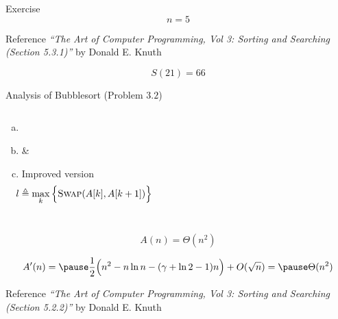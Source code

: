 \begin{frame}{}
  \begin{exampleblock}{Exercise}
    \[
      n = 5
    \]
  \end{exampleblock}

  \pause
  \vspace{0.80cm}
  \begin{alertblock}{Reference}
    {\it ``The Art of Computer Programming, Vol 3: Sorting and Searching (Section 5.3.1)''} by Donald E. Knuth
  \end{alertblock}

  \[
    S(21) = 66
  \]
\end{frame}

\begin{frame}{}
  \begin{exampleblock}{Analysis of Bubblesort (Problem $3.2$)}
    \begin{columns}
	\begin{enumerate}[(a)]
	  \item {}
	  \item {} \& 
	  \item Improved version 
	    \[
	      \!\!\!\! l \triangleq \max_{k} \Big\{\textsc{Swap}(A[k], A[k+1])\Big\}
	    \]
	\end{enumerate}
	
    \end{columns}
  \end{exampleblock}

  \pause
  \[
    A(n) = \Theta(n^2)
  \]

  \pause
  \vspace{-0.30cm}
  \[
    A'(n) = \pause \frac{1}{2} \Big(n^2 - n \ln n - (\gamma + \ln 2 - 1) n \Big) + O(\sqrt{n}) = \pause \Theta(n^2)
  \]

  \pause
  \vspace{-0.50cm}
  \begin{alertblock}{Reference}
    {\it ``The Art of Computer Programming, Vol 3: Sorting and Searching (Section 5.2.2)''} by Donald E. Knuth
  \end{alertblock}
\end{frame}

